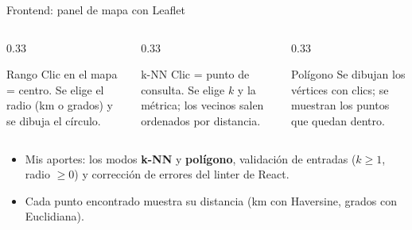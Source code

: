 \documentclass[aspectratio=169,10pt]{beamer}
\begin{document}
\begin{frame}{Frontend: panel de mapa con Leaflet}
  \begin{columns}[T]
    \begin{column}{0.33\textwidth}
      \begin{block}{Rango}
        \small Clic en el mapa = centro. Se elige el radio (km o grados) y se dibuja el círculo.
      \end{block}
    \end{column}
    \begin{column}{0.33\textwidth}
      \begin{block}{k-NN}
        \small Clic = punto de consulta. Se elige $k$ y la métrica; los vecinos salen ordenados por distancia.
      \end{block}
    \end{column}
    \begin{column}{0.33\textwidth}
      \begin{block}{Polígono}
        \small Se dibujan los vértices con clics; se muestran los puntos que quedan dentro.
      \end{block}
    \end{column}
  \end{columns}
  \vspace{0.8em}
  \begin{itemize}\small
    \item Mis aportes: los modos \textbf{k-NN} y \textbf{polígono}, validación de entradas ($k \ge 1$, radio $\ge 0$) y corrección de errores del linter de React.
    \item Cada punto encontrado muestra su distancia (km con Haversine, grados con Euclidiana).
  \end{itemize}
\end{frame}
\end{document}
